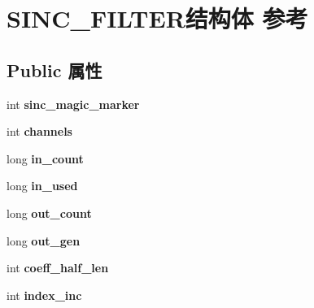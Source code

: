 \hypertarget{struct_s_i_n_c___f_i_l_t_e_r}{}\section{S\+I\+N\+C\+\_\+\+F\+I\+L\+T\+E\+R结构体 参考}
\label{struct_s_i_n_c___f_i_l_t_e_r}
\subsection*{Public 属性}
\begin{DoxyCompactItemize}
\item 
\mbox{\label{struct_s_i_n_c___f_i_l_t_e_r_a05215aff90cd3928bb9ca48c4ff29216}} 
int {\bfseries sinc\+\_\+magic\+\_\+marker}
\item 
\mbox{\label{struct_s_i_n_c___f_i_l_t_e_r_a8db375ff68539562ac44bdd6602fc756}} 
int {\bfseries channels}
\item 
\mbox{\label{struct_s_i_n_c___f_i_l_t_e_r_a35ab5f5dc4524cdb0939b4d6bcdd60c4}} 
long {\bfseries in\+\_\+count}
\item 
\mbox{\label{struct_s_i_n_c___f_i_l_t_e_r_aa85bc79617bd06453baf751054448c97}} 
long {\bfseries in\+\_\+used}
\item 
\mbox{\label{struct_s_i_n_c___f_i_l_t_e_r_a561b36a9e9afc030b3b66d05982710c3}} 
long {\bfseries out\+\_\+count}
\item 
\mbox{\label{struct_s_i_n_c___f_i_l_t_e_r_ab12cf941926b53d4424f594fe0962f48}} 
long {\bfseries out\+\_\+gen}
\item 
\mbox{\label{struct_s_i_n_c___f_i_l_t_e_r_a500f210ca54a47bb5acf41217c8889d3}} 
int {\bfseries coeff\+\_\+half\+\_\+len}
\item 
\mbox{\label{struct_s_i_n_c___f_i_l_t_e_r_af3960256f968bca1cb778baa51bb858f}} 
int {\bfseries index\+\_\+inc}
\item 
\mbox{\label{struct_s_i_n_c___f_i_l_t_e_r_a489f3e244e0454d7c0b8ca1b0e056a14}} 

\end{DoxyCompactItemize}
